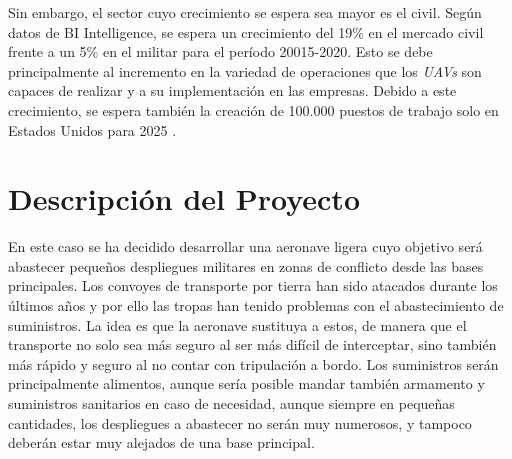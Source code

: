Sin embargo, el sector cuyo crecimiento se espera sea mayor es el civil. Según datos de BI Intelligence, se espera un crecimiento del 19\% en el mercado civil frente a un 5\% en el militar para el período 20015-2020.
Esto se debe principalmente al incremento en la variedad de operaciones que los \emph{UAVs} son capaces de realizar y a su implementación en las empresas. Debido a este crecimiento, se espera también la creación de 100.000 puestos de trabajo solo en Estados Unidos para 2025 \cite{AUVSI}.

\section{Descripción del Proyecto}

En este caso se ha decidido desarrollar una aeronave ligera cuyo objetivo será abastecer pequeños despliegues militares en zonas de conflicto desde las bases principales. Los convoyes de transporte por tierra han sido atacados durante los últimos años y por ello las tropas han tenido problemas con el abastecimiento de suministros. La idea es que la aeronave sustituya a estos, de manera que el transporte no solo sea más seguro al ser más difícil de interceptar, sino también más rápido y seguro al no contar con tripulación a bordo. 
Los suministros serán principalmente alimentos, aunque sería posible mandar también armamento y suministros sanitarios en caso de necesidad, aunque siempre en pequeñas cantidades, los despliegues a abastecer no serán muy numerosos, y tampoco deberán estar muy alejados de una base principal.

